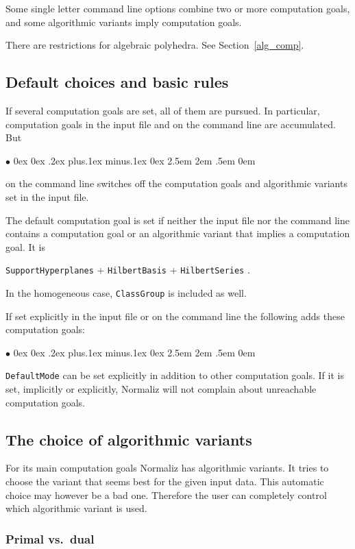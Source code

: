 \documentclass[12pt,a4paper]{scrartcl}
\newcommand{\stdli}{ \topsep0ex \partopsep0ex %
\parsep.2ex plus.1ex minus.1ex \itemsep0ex%
\leftmargin2.5em \labelwidth2em \labelsep.5em \rightmargin0em}%
\renewenvironment{itemize}{\begin{list}{{$\bullet$}}{\stdli}}{\end{list}}
\theoremstyle{definition}
\def\itemtt[#1]{\item[\textbf{\ttt{#1}}]}
\def\ttt{\texttt}
\begin{document}
Some single letter command line options combine two or more computation goals, and some algorithmic variants imply computation goals.

There are restrictions for algebraic polyhedra. See Section~\ref{alg_comp}.

\subsection{Default choices and basic rules}

If several computation goals are set, all of them are pursued. In particular, computation goals in the input file and on the command line are accumulated. But
\begin{itemize}
	\itemtt[-{}-ignore, -i] on the command line switches off the computation goals and algorithmic variants set in the input file.
\end{itemize}

The default computation goal is set if neither the input file nor the command line contains a computation goal or an algorithmic variant that implies a computation goal. It is
\begin{center}
	\verb|SupportHyperplanes| + \verb|HilbertBasis| + \verb|HilbertSeries| .
\end{center}
In the homogeneous case, \verb|ClassGroup| is included as well.

If set explicitly in the input file or on the command line the following adds these computation goals:
\begin{itemize}
	\itemtt[DefaultMode]
\end{itemize}

\verb|DefaultMode| can be set explicitly in addition to other computation goals. If it is set, implicitly or explicitly, Normaliz will not complain about unreachable computation goals.

\subsection{The choice of algorithmic variants}

For its main computation goals Normaliz has algorithmic variants. It tries to choose the variant that seems best for the given input data. This automatic choice may however be a bad one. Therefore the user can completely control which algorithmic variant is used.

\subsubsection{Primal vs.\ dual}
\end{document}
